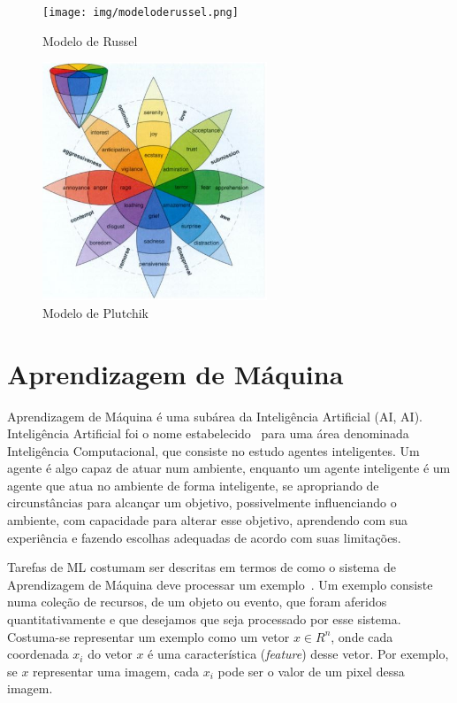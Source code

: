 \begin{figure}[!ht]
\centering
\texttt{[image: img/modeloderussel.png]}
\caption{\label{fig:russel}Modelo de Russel~\cite{img_russel}}
\end{figure}

\begin{figure}[!h]
\centering
\includegraphics[width=0.6\textwidth]{img/plutchik.JPG}
\caption{\label{fig:plutchik}Modelo de Plutchik~\cite{57}}
\end{figure}

\section{Aprendizagem de Máquina}\label{sec:ml}

Aprendizagem de Máquina é uma subárea da Inteligência Artificial (\acrlong{AI}, \acrshort{AI}). Inteligência Artificial foi o nome estabelecido~\cite{12.23} para uma área denominada Inteligência Computacional, que consiste no estudo agentes inteligentes. Um agente é algo capaz de atuar num ambiente, enquanto um agente inteligente é um agente que atua no ambiente de forma inteligente, se apropriando de circunstâncias para alcançar um objetivo, possivelmente influenciando o ambiente, com capacidade para alterar esse objetivo, aprendendo com sua experiência e fazendo escolhas adequadas de acordo com suas limitações.

Tarefas de \acrshort{ML} costumam ser descritas em termos de como o sistema de Aprendizagem de Máquina deve processar um exemplo~\cite{53}. Um exemplo consiste numa coleção de recursos, de um objeto ou evento, que foram aferidos quantitativamente e que desejamos que seja processado por esse sistema. Costuma-se representar um exemplo como um vetor $x \in R^n$, onde cada coordenada $x_i$ do vetor $x$ é uma característica (\textit{feature}) desse vetor. Por exemplo, se $x$ representar uma imagem, cada $x_i$ pode ser o valor de um pixel dessa imagem.

